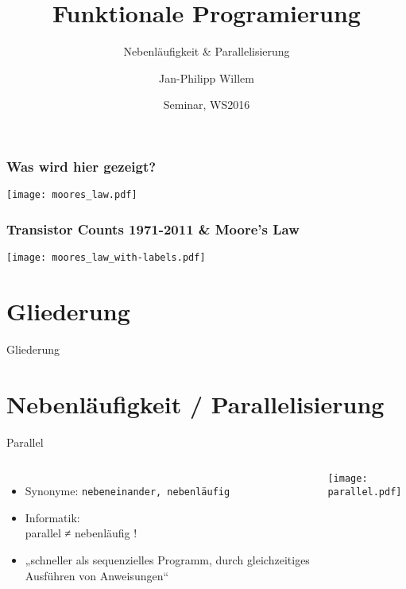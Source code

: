 \documentclass[compress]{beamer}
\title{Funktionale \break Programierung}
\subtitle{Nebenläufigkeit \& Parallelisierung}
\author{Jan-Philipp Willem}
\institute{
  Prof. Dr. Sandro Leuchter\\
  Fakultät für Informatik\\
  Hochschule Mannheim
}
\date{Seminar, WS2016}
\begin{document}
\begin{frame}
  \frametitle{Was wird hier gezeigt?}
  \texttt{[image: moores\_law.pdf]}
\end{frame}
 
\begin{frame}
  \frametitle{Transistor Counts 1971-2011 \& Moore's Law}
  \texttt{[image: moores\_law\_with-labels.pdf]}
\end{frame}

\maketitle

\section*{Gliederung}
\begin{frame}{Gliederung}
  \tableofcontents[hideallsubsections]
\end{frame}



\section[Nebenläufigkeit oder Parallelisierung?]{Nebenläufigkeit / Parallelisierung}
  \begin{frame}{Parallel}
  \setcounter{framenumber}{1}
    \begin{columns}[c]
      \begin{itemize}
        \item Synonyme: \texttt{nebeneinander, nebenläufig}
        \item Informatik:\\parallel ≠ nebenläufig !
        \item „schneller als sequenzielles Programm, durch \alert{gleichzeitiges} Ausführen von Anweisungen“
      \end{itemize}
    \texttt{[image: parallel.pdf]}
    \end{columns}
  \end{frame}
\end{document}
